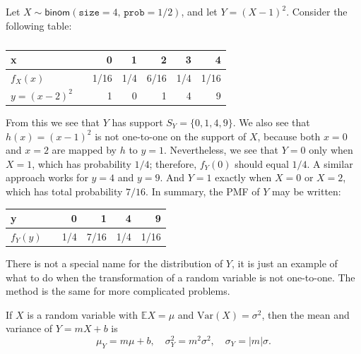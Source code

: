 \documentclass[captions=tableheading]{scrbook}
\begin{document}
\begin{example}
Let \(X\sim\mathsf{binom}(\mathtt{size}=4,\,\mathtt{prob}=1/2)\), and let \(Y=(X-1)^{2}\). Consider the following table:
\begin{table}[htb]
\caption{} \label{rem-poisson-process}
\begin{center}
\begin{tabular}{llrrrrr}
 x                &     &     0  &    1  &     2  &    3  &     4  \\
\hline
 \(f_{X}(x)\)     &     &  1/16  &  1/4  &  6/16  &  1/4  &  1/16  \\
\hline
 \(y=(x-2)^{2}\)  &     &     1  &    0  &     1  &    4  &     9  \\
\end{tabular}
\end{center}
\end{table}

From this we see that \(Y\) has support \(S_{Y}=\{0,1,4,9\}\). We also see that \(h(x)=(x-1)^{2}\) is not one-to-one on the support of \(X\), because both \(x=0\) and \(x=2\) are mapped by \(h\) to \(y=1\). Nevertheless, we see that \(Y=0\) only when \(X=1\), which has probability \(1/4\); therefore, \(f_{Y}(0)\) should equal \(1/4\). A similar approach works for \(y=4\) and \(y=9\). And \(Y=1\) exactly when \(X=0\) or \(X=2\), which has total probability \(7/16\). In summary, the PMF of \(Y\) may be written:

\begin{center}
\begin{tabular}{llrrrr}
 y             &     &    0  &     1  &    4  &     9  \\
\hline
 \(f_{Y}(y)\)  &     &  1/4  &  7/16  &  1/4  &  1/16  \\
\end{tabular}
\end{center}


There is not a special name for the distribution of \(Y\), it is just an example of what to do when the transformation of a random variable is not one-to-one. The method is the same for more complicated problems.
\end{example}

\begin{prop}
If \(X\) is a random variable with \(\mathbb{E} X=\mu\) and \(\mbox{Var}(X)=\sigma^{2}\), then the mean and variance of \(Y=mX+b\) is
\begin{equation}
\mu_{Y}=m\mu+b,\quad\sigma_{Y}^{2}=m^{2}\sigma^{2},\quad\sigma_{Y}=|m|\sigma.
\end{equation}
\end{prop}
\end{document}
